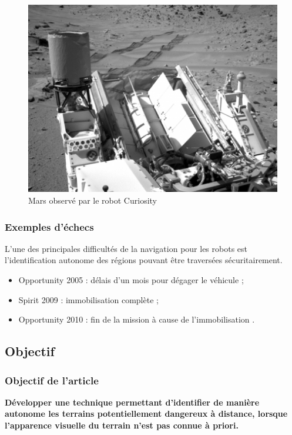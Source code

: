 \begin{frame}
\begin{center}
\begin{figure}
            \includegraphics[height=0.4\textheight]{./media/wheelSand.jpg}
            \caption{Mars observé par le robot Curiosity \cite{nasa}}
        \end{figure}            
        \end{center} 
    \end{frame}
    
    \begin{frame}
        \frametitle{Exemples d'échecs}
        L'une des principales difficultés de la navigation pour les robots est l'identification autonome des régions pouvant être traversées sécuritairement.   
        \begin{itemize}
            \item Opportunity 2005 : délais d'un mois pour dégager le véhicule \cite{Brooks2012} ;
            \item Spirit 2009 : immobilisation complète \citep{spirit} ;
            \item Opportunity 2010 : fin de la mission à cause de l'immobilisation \cite{Brooks2012}.
        \end{itemize}
    \end{frame}
    
\subsection{Objectif}
    \begin{frame}[c]
        \frametitle{Objectif de l'article}
        \textbf{Développer une technique permettant d'identifier de manière autonome les terrains potentiellement dangereux à distance, lorsque l'apparence visuelle du terrain n'est pas connue à priori.}
    \end{frame}